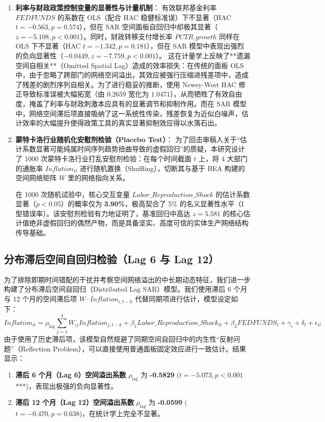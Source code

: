 \documentclass[UTF8,a4paper,11pt]{ctexart}
\begin{document}
\begin{enumerate}
    \item \textbf{利率与财政政策控制变量的显著性与计量机制}：
    有效联邦基金利率 $FEDFUNDS$ 的系数在 OLS（配合 HAC 稳健标准误）下不显著（HAC $t = -0.563, p = 0.574$），但在 SAR 空间面板自回归中却极其显著（$z = -5.108, p < 0.001$）。同时，财政转移支付增长率 $PCTR\_growth$ 同样在 OLS 下不显著（HAC $t = -1.342, p = 0.181$），但在 SAR 模型中表现出强烈的负向显著性（$-0.0449, z = -7.759, p < 0.001$）。
    这在计量学上反映了**遗漏空间自相关**（Omitted Spatial Lag）造成的效率损失：在传统的面板 OLS 中，由于忽略了跨部门的网络空间溢出，其效应被强行压缩进残差项中，造成了残差的剧烈序列自相关。为了进行稳妥的推断，使用 Newey-West HAC 修正导致标准误被大幅拓宽（由 $0.2659$ 宽化为 $1.0471$），从而牺牲了有效自由度，掩盖了利率与财政刺激本应具有的显著调节和抑制作用。而在 SAR 模型中，网络空间滞后项直接吸纳了这一系统性传染，残差恢复为近似白噪声，估计效率的大幅提升使得政策工具的真实显著抑制效应得以水落石出。

    \item \textbf{蒙特卡洛行业随机化安慰剂检验（Placebo Test）}：
    为了回击审稿人关于“估计系数显著可能纯属时间序列趋势扭曲导致的虚假回归”的质疑，本研究设计了 1000 次蒙特卡洛行业打乱安慰剂检验：在每个时间截面 $t$ 上，将 4 大部门的通胀率 $Inflation_{it}$ 进行随机置换（Shuffling），切断其与基于 BEA 构建的空间网络矩阵 $W$ 里的网络指向关系。
    
    在 1000 次随机试验中，核心交互变量 $Labor\_Reproduction\_Shock$ 的估计系数显著（$p < 0.05$）的概率仅为 \textbf{3.90\%}，极高契合了 5\% 的名义显著性水平（I 型错误率）。该安慰剂检验有力地证明了，基准回归中高达 $z = 5.581$ 的核心估计值绝非虚假回归的偶然产物，而是具备坚实、高度可信的实体生产网络结构传导基础。
\end{enumerate}

\subsection{分布滞后空间自回归检验（Lag 6 与 Lag 12）}
为了排除即期时间错配的干扰并考察空间网络溢出的中长期动态特征，我们进一步构建了分布滞后空间自回归（Distributed Lag SAR）模型。我们使用滞后 6 个月与 12 个月的空间滞后项 $W \cdot Inflation_{i, t-k}$ 代替同期项进行估计，模型设定如下：
\[Inflation_{it} = \rho_{\text{lag}} \sum_{j=1}^{4} W_{ij} Inflation_{j, t-k} + \beta_1 Labor\_Reproduction\_Shock_{it} + \beta_2 FEDFUNDS_{t} + \gamma_i + \delta_t + \epsilon_{it}\]
由于使用了历史滞后项，该模型自然规避了同期空间自回归中的内生性“反射问题”（Reflection Problem），可以直接使用普通面板固定效应进行一致估计。结果显示：
\begin{enumerate}
    \item \textbf{滞后 6 个月（Lag 6）空间溢出系数} $\rho_{\text{lag}}$ 为 \textbf{-0.5829} ($t = -5.073, p < 0.001$ ***)，表现出极强的负向显著性。
    \item \textbf{滞后 12 个月（Lag 12）空间溢出系数} $\rho_{\text{lag}}$ 为 \textbf{-0.0599} ($t = -0.470, p = 0.638$)，在统计学上完全不显著。
\end{enumerate}
\end{document}
